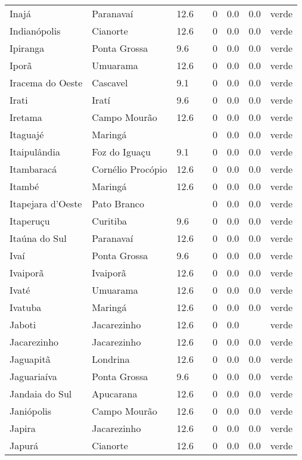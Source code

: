 \begin{longtable}{l|lllllll}
  Inajá & Paranavaí & 12.6 &  & 0 & 0.0 & 0.0 & verde \\ 
  Indianópolis & Cianorte & 12.6 &  & 0 & 0.0 & 0.0 & verde \\ 
  Ipiranga & Ponta Grossa & 9.6 &  & 0 & 0.0 & 0.0 & verde \\ 
  Iporã & Umuarama & 12.6 &  & 0 & 0.0 & 0.0 & verde \\ 
  Iracema do Oeste & Cascavel & 9.1 &  & 0 & 0.0 & 0.0 & verde \\ 
  Irati & Iratí & 9.6 &  & 0 & 0.0 & 0.0 & verde \\ 
  Iretama & Campo Mourão & 12.6 &  & 0 & 0.0 & 0.0 & verde \\ 
  Itaguajé & Maringá &  &  & 0 & 0.0 & 0.0 & verde \\ 
  Itaipulândia & Foz do Iguaçu & 9.1 &  & 0 & 0.0 & 0.0 & verde \\ 
  Itambaracá & Cornélio Procópio & 12.6 &  & 0 & 0.0 & 0.0 & verde \\ 
  Itambé & Maringá & 12.6 &  & 0 & 0.0 & 0.0 & verde \\ 
  Itapejara d'Oeste & Pato Branco &  &  & 0 & 0.0 & 0.0 & verde \\ 
  Itaperuçu & Curitiba & 9.6 &  & 0 & 0.0 & 0.0 & verde \\ 
  Itaúna do Sul & Paranavaí & 12.6 &  & 0 & 0.0 & 0.0 & verde \\ 
  Ivaí & Ponta Grossa & 9.6 &  & 0 & 0.0 & 0.0 & verde \\ 
  Ivaiporã & Ivaiporã & 12.6 &  & 0 & 0.0 & 0.0 & verde \\ 
  Ivaté & Umuarama & 12.6 &  & 0 & 0.0 & 0.0 & verde \\ 
  Ivatuba & Maringá & 12.6 &  & 0 & 0.0 & 0.0 & verde \\ 
  Jaboti & Jacarezinho & 12.6 &  & 0 & 0.0 &  & verde \\ 
  Jacarezinho & Jacarezinho & 12.6 &  & 0 & 0.0 & 0.0 & verde \\ 
  Jaguapitã & Londrina & 12.6 &  & 0 & 0.0 & 0.0 & verde \\ 
  Jaguariaíva & Ponta Grossa & 9.6 &  & 0 & 0.0 & 0.0 & verde \\ 
  Jandaia do Sul & Apucarana & 12.6 &  & 0 & 0.0 & 0.0 & verde \\ 
  Janiópolis & Campo Mourão & 12.6 &  & 0 & 0.0 & 0.0 & verde \\ 
  Japira & Jacarezinho & 12.6 &  & 0 & 0.0 & 0.0 & verde \\ 
  Japurá & Cianorte & 12.6 &  & 0 & 0.0 & 0.0 & verde \\ 

\end{longtable}
